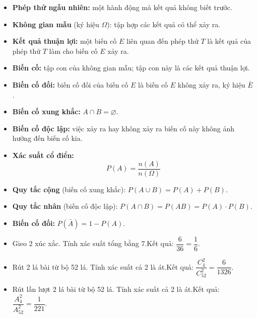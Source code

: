 \documentclass[12pt,a4paper]{article}
\begin{document}
\begin{dinhnghia}
  \begin{itemize}
    \item \textbf{Phép thử ngẫu nhiên:} một hành động mà kết quả không biết trước.
    \item \textbf{Không gian mẫu} (ký hiệu $\Omega$): tập hợp các kết quả có thể xảy ra.
    \item \textbf{Kết quả thuận lợi:} một biến cố $E$ liên quan đến phép thử $T$ là kết quả của phép thử $T$ làm cho biến cố $E$ xảy ra.
    \item \textbf{Biến cố:} tập con của không gian mẫu; tập con này là các kết quả thuận lợi.
    \item \textbf{Biến cố đối:} biến cố đối của biến cố $E$ là biến cố $E$ không xảy ra, ký hiệu $\bar{E}$.
    \item \textbf{Biến cố xung khắc:} $A \cap B = \varnothing$.
    \item \textbf{Biến cố độc lập:} việc xảy ra hay không xảy ra biến cố này không ảnh hưởng đến biến cố kia.
  \end{itemize}
\end{dinhnghia}

\begin{congthuc}[title={Xác suất}]
  \begin{itemize}
    \item \textbf{Xác suất cổ điển:}
      \[
        P(A) = \dfrac{n(A)}{n(\Omega)}
      \]
    \item \textbf{Quy tắc cộng} (biến cố xung khắc): $P(A \cup B) = P(A) + P(B)$.
    \item \textbf{Quy tắc nhân} (biến cố độc lập): $P(A \cap B) = P(AB) = P(A) \cdot P(B)$.
    \item \textbf{Biến cố đối:} $P(\bar{A}) = 1 - P(A)$.
  \end{itemize}
\end{congthuc}

\begin{vidu}
  \begin{itemize}
    \item Gieo 2 xúc xắc. Tính xác suất tổng bằng 7.\quad Kết quả: $\dfrac{6}{36} = \dfrac{1}{6}$.
    \item Rút 2 lá bài từ bộ 52 lá. Tính xác suất cả 2 là át.\quad Kết quả: $\dfrac{C_4^2}{C_{52}^2} = \dfrac{6}{1326}$.
    \item Rút lần lượt 2 lá bài từ bộ 52 lá. Tính xác suất cả 2 là át.\quad Kết quả: $\dfrac{A_4^2}{A_{52}^2} = \dfrac{1}{221}$.
  \end{itemize}
\end{vidu}
\end{document}
